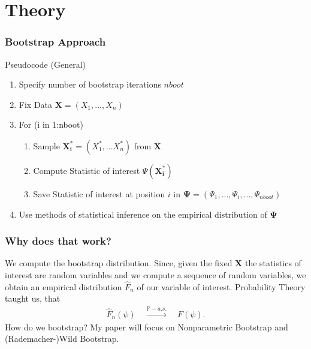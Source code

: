 \documentclass[9pt, dvipsnames]{beamer} %
\begin{document}
    \section{Theory}
    \begin{frame}
    	\frametitle{\textbf{Bootstrap Approach}}
    		\begin{block}{Pseudocode (General)}
    			\begin{enumerate}
    				\item Specify number of bootstrap iterations $nboot$
    				\item Fix Data $\mathbf{X} = (X_1, ..., X_n)$
    				\item For (i in 1:nboot)
    				\begin{enumerate}
    					\item Sample $\mathbf{X_i^{*}} = (X_{1}^{*}, ... X_{n}^{*})$ from $\mathbf{X}$
    					\item Compute Statistic of interest $\Psi(\mathbf{X_i^{*}})$
    					\item Save Statistic of interest at position $i$ in $\mathbf{\Psi} = (\Psi_1, ..., \Psi_i, ..., \Psi_{nboot})$
    				\end{enumerate}
					\item Use methods of statistical inference on the empirical distribution of $\mathbf{\Psi}$
    			\end{enumerate}
    		\end{block}
    \end{frame}
    \begin{frame}
    	\frametitle{\textbf{Why does that work?}}
    		We compute the bootstrap distribution. Since, given the fixed $\mathbf{X}$ the statistics of interest are random variables and we compute a sequence of random variables, we obtain an empirical distribution $\hat{F}_n$ of our variable of interest. Probability Theory taught us, that
    		\begin{align*}
    			\hat{F}_n(\psi) \quad \stackrel{\mathbb{P}-a.s.}{\to} \quad F(\psi).
    		\end{align*}
    		How do we bootstrap? My paper will focus on Nonparametric Bootstrap and (Rademacher-)Wild Bootstrap. 
	\end{frame}
\end{document}
